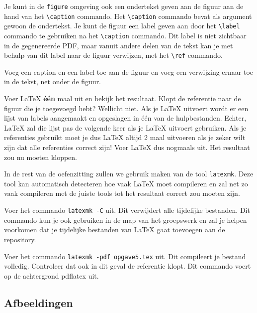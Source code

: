 \documentclass[12pt, dutch]{article}
\newcommand{\bs}{\textbackslash}
\begin{document}
Je kunt in de \texttt{figure} omgeving ook een ondertekst geven aan de figuur
aan de hand van het \texttt{\bs{}caption} commando. Het \texttt{\bs{}caption}
commando bevat als argument gewoon de ondertekst. Je kunt
de figuur een label geven aan door het \texttt{\bs{}label} commando te
gebruiken na het \texttt{\bs{}caption} commando. Dit
label is niet zichtbaar in de gegenereerde PDF, maar vanuit andere
delen van de tekst kan je met behulp van dit label naar de figuur
verwijzen, met het \texttt{\bs{}ref} commando.


\begin{tcolorbox}[title=Opgave 5d]
  Voeg een caption en een label toe aan de figuur en voeg een verwijzing ernaar
  toe in de tekst, net onder de figuur.
\end{tcolorbox}

Voer \LaTeX{} \textbf{\'e\'en} maal uit en bekijk het resultaat. Klopt
de referentie naar de figuur die je toegevoegd hebt? Wellicht niet.
Als je \LaTeX{} uitvoert wordt er een lijst van labels aangemaakt en opgeslagen
in \'e\'en van de hulpbestanden.
Echter, \LaTeX{} zal die lijst pas de volgende keer als je \LaTeX{}
uitvoert gebruiken. Als je referenties gebruikt moet je dus \LaTeX{}
altijd 2 maal uitvoeren als je zeker wilt zijn dat alle referenties
correct zijn! Voer \LaTeX{} dus nogmaals uit. Het resultaat zou nu
moeten kloppen.

In de rest van de oefenzitting zullen we gebruik maken van de tool
\texttt{latexmk}. Deze tool kan automatisch detecteren hoe vaak \LaTeX{} moet
compileren en zal net zo vaak compileren met de juiste tools tot het resultaat
correct zou moeten zijn.


\begin{tcolorbox}[title=Opgave 5e]
  Voer het commando \texttt{latexmk -C} uit. Dit verwijdert alle tijdelijke
  bestanden. Dit commando kun je ook gebruiken in de map van het groepswerk en
  zal je helpen voorkomen dat je tijdelijke bestanden van \LaTeX{} gaat
  toevoegen aan de repository.
\end{tcolorbox}
\begin{tcolorbox}[title=Opgave 5f]
  Voer het commando \texttt{latexmk -pdf opgave5.tex} uit. Dit compileert je
  bestand volledig. Controleer dat ook in dit geval de referentie klopt. Dit
  commando voert op de achtergrond pdflatex uit.
\end{tcolorbox}

\subsection{Afbeeldingen}
\end{document}
